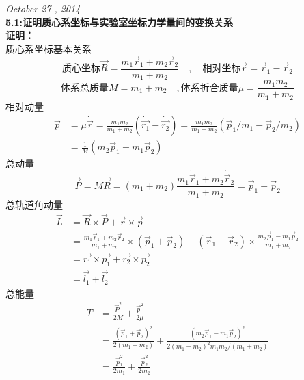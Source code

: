 \documentclass[a4paper]{article}
\newcommand{\VEC}[1]{\overrightarrow{#1}}
\begin{document}
\begin{CJK*}{UTF8}{song}
    \noindent\Large{\emph{October 27 , 2014}}\\[15pt]
    \noindent \textbf{5.1:证明质心系坐标与实验室坐标力学量间的变换关系}\\[8pt]
    {
    \noindent\textbf{证明：}\\[5pt]
    质心系坐标基本关系
    $$\mbox{质心坐标}\vec{R}
        =\frac{m_{1}\vec{r}_{1}+m_{2}\vec{r}_{2}}{m_{1}+m_{2}}\quad,
        \quad\mbox{相对坐标}\vec{r}=\vec{r}_{1}-\vec{r}_{2}$$
    $$\mbox{体系总质量}M=m_{1}+m_{2}\quad,
        \mbox{体系折合质量}\mu=\frac{m_{1}m_{2}}{m_{1}+m_{2}}$$
    相对动量
    \begin{equation*}\begin{split}
    \vec{p} & = \mu\dot{\vec{r}}=\frac{m_{1}m_{2}}{m_{1}+m_{2}}
        (\dot{\vec{r_{1}}}-\dot{\vec{r_{2}}})
        =\frac{m_{1}m_{2}}{m_{1}+m_{2}}(\vec{p}_{1}/m_{1}-\vec{p}_{2}/m_{2})\\
        & =\frac{1}{M}(m_{2}\vec{p}_{1}-m_{1}\vec{p}_{2})
    \end{split}\end{equation*}
    总动量
    $$\vec{P}=M\dot{\vec{R}}=(m_{1}+m_{2})
        \frac{m_{1}\dot{\vec{r}}_{1}+m_{2}\dot{\vec{r}}_{2}}{m_{1}+m_{2}}
        =\vec{p}_{1}+\vec{p}_{2}$$
    总轨道角动量
    \begin{equation*}\begin{split}
    \vec{L}
        & = \vec{R}\times\vec{P}+\vec{r}\times\vec{p}\\
        & = \frac{m_{1}\vec{r}_{1}+m_{2}\vec{r}_{2}}{m_{1}+m_{2}}
            \times(\vec{p}_{1}+\vec{p}_{2})+(\vec{r}_{1}-\vec{r}_{2})
            \times\frac{m_{2}\vec{p}_{1}-m_{1}\vec{p}_{2}}{m_{1}+m_{2}}\\
        & = \vec{r_{1}}\times\vec{p_{1}}+\vec{r_{2}}\times\vec{p_{2}}\\
        & = \VEC{l_{1}}+\VEC{l_{2}}
    \end{split}\end{equation*}
    总能量
    \begin{equation*}\begin{split}
    T   & = \frac{\vec{P}^{2}}{2M}+\frac{\vec{p}^{2}}{2\mu}\\
        & = \frac{(\vec{p}_{1}+\vec{p}_{2})^{2}}{2(m_{1}+m_{2})}
            +\frac{(m_{2}\vec{p}_{1}-m_{1}\vec{p}_{2})^{2}}               {2(m_{1}+m_{2})^{2}m_{1}m_{2}/(m_{1}+m_{2})}\\
        & =\frac{\vec{p}_{1}^{2}}{2 m_{1}}+\frac{\vec{p}_{2}^{2}}{2 m_{2}}
    \end{split}\end{equation*}
}
\end{CJK*}
\end{document}
